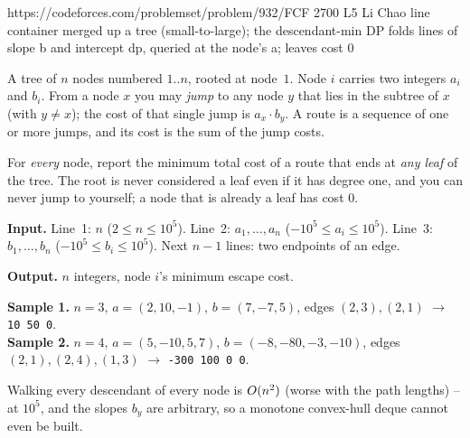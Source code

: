   {https://codeforces.com/problemset/problem/932/F}{CF 2700 L5}
  {Li Chao line container merged up a tree (small-to-large); the descendant-min DP folds lines of slope b and intercept dp, queried at the node's a; leaves cost 0}

\begin{problemstatement}
A tree of \(n\) nodes numbered \(1..n\), rooted at node~\(1\). Node \(i\) carries two integers
\(a_i\) and \(b_i\). From a node \(x\) you may \emph{jump} to any node \(y\) that lies in the subtree
of \(x\) (with \(y\ne x\)); the cost of that single jump is \(a_x\cdot b_y\). A route is a sequence of
one or more jumps, and its cost is the sum of the jump costs.

For \emph{every} node, report the minimum total cost of a route that ends at \emph{any leaf} of the
tree. The root is never considered a leaf even if it has degree one, and you can never jump to
yourself; a node that is already a leaf has cost \(0\).

\textbf{Input.} Line~1: \(n\) (\(2\le n\le 10^{5}\)). Line~2: \(a_1,\dots,a_n\)
(\(-10^{5}\le a_i\le 10^{5}\)). Line~3: \(b_1,\dots,b_n\) (\(-10^{5}\le b_i\le 10^{5}\)). Next
\(n-1\) lines: two endpoints of an edge.

\textbf{Output.} \(n\) integers, node \(i\)'s minimum escape cost.

\textbf{Sample 1.} \(n{=}3\), \(a=(2,10,-1)\), \(b=(7,-7,5)\), edges \((2,3),(2,1)\)
\(\to\) \texttt{10 50 0}.\\
\textbf{Sample 2.} \(n{=}4\), \(a=(5,-10,5,7)\), \(b=(-8,-80,-3,-10)\), edges \((2,1),(2,4),(1,3)\)
\(\to\) \texttt{-300 100 0 0}.
\end{problemstatement}

\begin{attemptgate}
Walking every descendant of every node is \(O(n^2)\) (worse with the path lengths) -- \tle at
\(10^5\), and the slopes \(b_y\) are arbitrary, so a monotone convex-hull deque cannot even be built.
\end{attemptgate}

